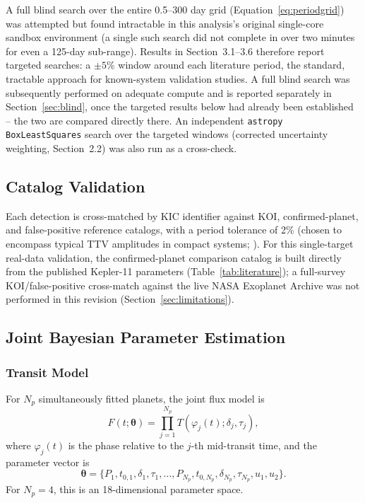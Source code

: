 \documentclass[11pt]{article}
\begin{document}
A full blind search over the entire 0.5--300 day grid (Equation~\ref{eq:periodgrid}) was attempted but found intractable in this analysis's original single-core sandbox environment (a single such search did not complete in over two minutes for even a 125-day sub-range). Results in Section~3.1--3.6 therefore report targeted searches: a $\pm5$\% window around each literature period, the standard, tractable approach for known-system validation studies. A full blind search was subsequently performed on adequate compute and is reported separately in Section~\ref{sec:blind}, once the targeted results below had already been established -- the two are compared directly there. An independent \texttt{astropy} \texttt{BoxLeastSquares} search over the targeted windows (corrected uncertainty weighting, Section~2.2) was also run as a cross-check.

\subsection{Catalog Validation}

Each detection is cross-matched by KIC identifier against KOI, confirmed-planet, and false-positive reference catalogs, with a period tolerance of 2\% (chosen to encompass typical TTV amplitudes in compact systems; \citealt{Lissauer2011}). For this single-target real-data validation, the confirmed-planet comparison catalog is built directly from the \citet{Lissauer2011,Lissauer2013} published Kepler-11 parameters (Table~\ref{tab:literature}); a full-survey KOI/false-positive cross-match against the live NASA Exoplanet Archive was not performed in this revision (Section~\ref{sec:limitations}).

\subsection{Joint Bayesian Parameter Estimation}

\subsubsection{Transit Model}

For $N_p$ simultaneously fitted planets, the joint flux model is
\begin{equation}
F(t;\boldsymbol\theta) = \prod_{j=1}^{N_p} T(\varphi_j(t);\delta_j,\tau_j),
\label{eq:jointmodel}
\end{equation}
where $\varphi_j(t)$ is the phase relative to the $j$-th mid-transit time, and the parameter vector is
\begin{equation}
\boldsymbol\theta = \{P_1,t_{0,1},\delta_1,\tau_1,\dots,P_{N_p},t_{0,N_p},\delta_{N_p},\tau_{N_p},u_1,u_2\}.
\label{eq:paramvec}
\end{equation}
For $N_p=4$, this is an 18-dimensional parameter space.
\end{document}
